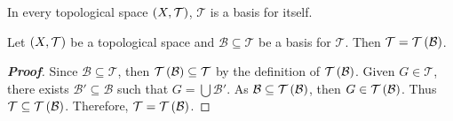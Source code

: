 \begin{remark}
  In every topological space $\left(X,\mathcal{T}\right)$, $\mathcal{T}$ is a basis for itself.
\end{remark}

\begin{proposition}
  Let $\left(X,\mathcal{T}\right)$ be a topological space and $\mathcal{B}\subseteq\mathcal{T}$ be a basis for $\mathcal{T}$. Then $\mathcal{T}=\mathcal{T}\left(\mathcal{B}\right)$.
  \begin{proof}[\rm\textbf{Proof}]
    Since $\mathcal{B}\subseteq\mathcal{T}$, then $\mathcal{T}\left(\mathcal{B}\right)\subseteq\mathcal{T}$ by the definition of $\mathcal{T}\left(\mathcal{B}\right)$. Given $G\in\mathcal{T}$, there exists $\mathcal{B}'\subseteq\mathcal{B}$ such that $G=\bigcup{\mathcal{B}'}$. As $\mathcal{B}\subseteq\mathcal{T}\left(\mathcal{B}\right)$, then $G\in\mathcal{T}\left(\mathcal{B}\right)$. Thus $\mathcal{T}\subseteq\mathcal{T}\left(\mathcal{B}\right)$. Therefore, $\mathcal{T}=\mathcal{T}\left(\mathcal{B}\right)$.
  \end{proof}
\end{proposition}

